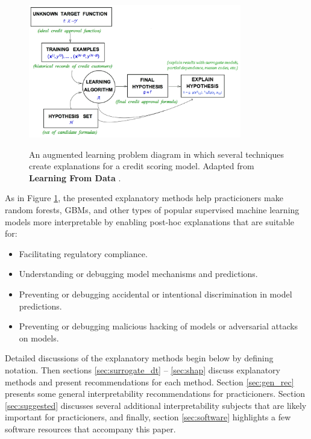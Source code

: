 \documentclass{article}
\begin{document}
\begin{figure}[htb]
	\begin{center}
		\includegraphics[height=165pt]{img/learning_problem.png}
		\label{fig:learning_problem}
		\caption{An augmented learning problem diagram in which several techniques create explanations for a credit scoring model. Adapted from \textbf{Learning From Data} \cite{lfd}.}
	\end{center}
\end{figure}	
	
As in Figure \ref{fig:learning_problem}, the presented explanatory methods help practicioners make random forests, GBMs, and other types of popular supervised  machine learning models more interpretable by enabling post-hoc explanations that are suitable for:\\

\begin{itemize}
	\item Facilitating regulatory compliance.
	\item Understanding or debugging model mechanisms and predictions.
	\item Preventing or debugging accidental or intentional discrimination in model predictions.
	\item Preventing or debugging malicious hacking of models or adversarial attacks on models.
\end{itemize}

Detailed discussions of the explanatory methods begin below by defining notation. Then sections \ref{sec:surrogate_dt} -- \ref{sec:shap} discuss explanatory methods and present recommendations for each method. Section \ref{sec:gen_rec} presents some general interpretability recommendations for practicioners. Section \ref{sec:suggested} discusses several additional interpretability subjects that are likely important for practicioners, and finally, section \ref{sec:software} highlights a few software resources that accompany this paper. 
\end{document}

